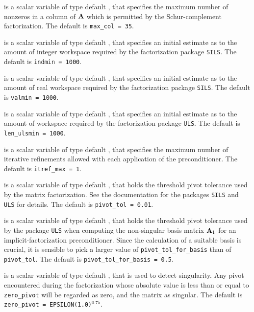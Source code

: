 \documentclass{galahad}
\begin{document}
\begin{description}
 is a scalar variable of type default \integer, that specifies
the maximum number of nonzeros in a column of ${\mathbf{A}}$ which is permitted
by the Schur-complement factorization.
The default is {\tt max\_col = 35}.

 is a scalar variable of type default \integer, that specifies
an initial estimate as to the amount of integer workspace required by 
the factorization package {\tt SILS}.
The default is {\tt indmin = 1000}.

 is a scalar variable of type default \integer, that specifies
an initial estimate as to the amount of real workspace required by 
the factorization package {\tt SILS}.
The default is {\tt valmin = 1000}.

 is a scalar variable of type default \integer, that specifies
an initial estimate as to the amount of workspace required by 
the factorization package {\tt ULS}.
The default is {\tt len\_ulsmin = 1000}.

 is a scalar variable of type default \integer, that specifies 
the maximum number of iterative refinements allowed with each application 
of the preconditioner.
The default is {\tt itref\_max = 1}.



  is a scalar variable of type default 
\realdp, that holds the
threshold pivot tolerance used by the matrix factorization.  See 
the documentation for the packages {\tt SILS} and {\tt ULS} for details.
The default is {\tt pivot\_tol = 0.01}.

 is a scalar variable of type default 
\realdp, that holds the
threshold pivot  tolerance used by the package {\tt ULS} 
when computing the non-singular basis matrix ${\mathbf{A}}_1$ for
an implicit-factorization preconditioner. Since the calculation of a
suitable basis is crucial, it is sensible to pick a larger
value of {\tt pivot\_tol\_for\_basis} than of {\tt pivot\_tol}.
The default is {\tt pivot\_tol\_for\_basis = 0.5}.

 is a scalar variable of type default \realdp, 
that is used to detect singularity. Any pivot encountered during the
factorization whose absolute value is less than or equal to  {\tt zero\_pivot}
will be regarded as zero, and the matrix as singular.
The default is {\tt zero\_pivot = EPSILON(1.0)}$^{0.75}$.


\end{description}
\end{document}
